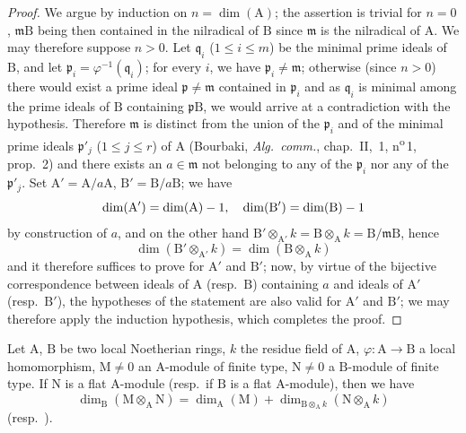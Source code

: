 \begin{proof}
We argue by induction on $n=\dim(\mathrm{A})$; the assertion is trivial for $n=0$, $\mathfrak{m}\mathrm{B}$ being then contained in the nilradical of $\mathrm{B}$ since $\mathfrak{m}$ is the nilradical of $\mathrm{A}$.
We may therefore suppose $n>0$.
Let $\mathfrak{q}_i$ ($1\leqslant i\leqslant m$) be the minimal prime ideals of $\mathrm{B}$, and let $\mathfrak{p}_i=\varphi^{-1}(\mathfrak{q}_i)$; for every $i$, we have $\mathfrak{p}_i\neq\mathfrak{m}$; otherwise (since $n>0$) there would exist a prime ideal $\mathfrak{p}\neq\mathfrak{m}$ contained in $\mathfrak{p}_i$ and as $\mathfrak{q}_i$ is minimal among the prime ideals of $\mathrm{B}$ containing $\mathfrak{p}\mathrm{B}$, we would arrive at a contradiction with the hypothesis.
Therefore $\mathfrak{m}$ is distinct from the union of the $\mathfrak{p}_i$ and of the minimal prime ideals $\mathfrak{p}'_j$ ($1\leqslant j\leqslant r$) of $\mathrm{A}$ (Bourbaki, \emph{Alg.\ comm.}, chap.~II, \textsection\,1, n\textsuperscript{o}\,1, prop.~2) and there exists an $a\in\mathfrak{m}$ not belonging to any of the $\mathfrak{p}_i$ nor any of the $\mathfrak{p}'_j$.
Set $\mathrm{A}'=\mathrm{A}/a\mathrm{A}$, $\mathrm{B}'=\mathrm{B}/a\mathrm{B}$; we have 
\[
  \dim(\mathrm{A}')=\dim(\mathrm{A})- 1,\quad
  \dim(\mathrm{B}')=\dim(\mathrm{B})- 1
\]
by construction of $a$, and on the other hand $\mathrm{B}'\otimes_{\mathrm{A}'}k=\mathrm{B}\otimes_\mathrm{A} k=\mathrm{B}/\mathfrak{m}\mathrm{B}$, hence
\[
  \dim(\mathrm{B}'\otimes_{\mathrm{A}'}k)=\dim(\mathrm{B}\otimes_\mathrm{A} k)
\]
and it therefore suffices to prove  for $\mathrm{A}'$ and $\mathrm{B}'$; now, by virtue of the bijective correspondence between ideals of $\mathrm{A}$ (resp.\ $\mathrm{B}$) containing $a$ and ideals of $\mathrm{A}'$ (resp.\ $\mathrm{B}'$), the hypotheses of the statement are also valid for $\mathrm{A}'$ and $\mathrm{B}'$; we may therefore apply the induction hypothesis, which completes the proof.
\end{proof}

\begin{corollary}[6.1.2]
\label{IV.6.1.2}
Let $\mathrm{A}$, $\mathrm{B}$ be two local Noetherian rings, $k$ the residue field of $\mathrm{A}$, $\varphi:\mathrm{A}\to\mathrm{B}$ a local homomorphism, $\mathrm{M}\neq 0$ an $\mathrm{A}$-module of finite type, $\mathrm{N}\neq 0$ a $\mathrm{B}$-module of finite type.
If $\mathrm{N}$ is a flat $\mathrm{A}$-module \textnormal{(resp.\ }if $\mathrm{B}$ is a flat $\mathrm{A}$-module\textnormal{)}, then we have
\begin{equation}
  \dim_\mathrm{B}(\mathrm{M}\otimes_\mathrm{A}\mathrm{N})=\dim_\mathrm{A}(\mathrm{M})+\dim_{\mathrm{B}\otimes_\mathrm{A} k}(\mathrm{N}\otimes_\mathrm{A} k)
  \label{IV.6.1.2.1}
\tag{6.1.2.1}
\end{equation}
\textnormal{(}resp.\ \textnormal{)}.
\end{corollary}

